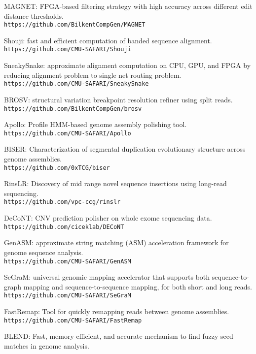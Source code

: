 \begin{list2}
\item
  MAGNET: FPGA-based filtering strategy with high accuracy across different edit distance thresholds.\\
  {\tt https://github.com/BilkentCompGen/MAGNET}
  
\item
  Shouji: fast and efficient computation of banded sequence alignment.
  {\tt https://github.com/CMU-SAFARI/Shouji}
\item
  SneakySnake: approximate alignment computation on CPU, GPU, and FPGA by reducing alignment problem to single net routing problem.
  {\tt https://github.com/CMU-SAFARI/SneakySnake}
\item
  BROSV: structural variation breakpoint resolution refiner using split reads.\\
  {\tt https://github.com/BilkentCompGen/brosv}
  \item
  Apollo: Profile HMM-based genome assembly polishing tool.
  {\tt https://github.com/CMU-SAFARI/Apollo}
  \item
  BISER: Characterization of segmental duplication evolutionary structure across  genome assemblies.\\
  {\tt https://github.com/0xTCG/biser}
  \item
  RinsLR: Discovery of mid range novel sequence insertions using long-read sequencing.\\
  {\tt https://github.com/vpc-ccg/rinslr}
  \item
DeCoNT: CNV prediction polisher on whole exome sequencing data.\\
{\tt https://github.com/ciceklab/DECoNT}
  \item
GenASM: approximate string matching (ASM) acceleration framework for genome sequence analysis.\\
  {\tt https://github.com/CMU-SAFARI/GenASM}
  \item
  SeGraM: universal genomic mapping accelerator that supports both sequence-to-graph mapping and sequence-to-sequence mapping, for both short and long reads.\\
{\tt https://github.com/CMU-SAFARI/SeGraM}
  \item
FastRemap: Tool for quickly remapping reads between genome assemblies.\\
{\tt https://github.com/CMU-SAFARI/FastRemap}
  \item
BLEND: Fast, memory-efficient, and accurate mechanism to find fuzzy seed matches in genome analysis.\\

\end{list2}
